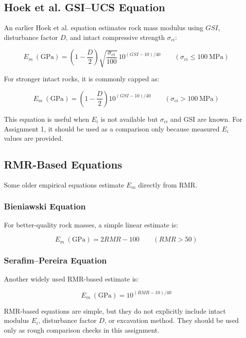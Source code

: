 \documentclass[a4paper,12pt]{article}
\begin{document}
\subsection{Hoek et al. GSI--UCS Equation}

An earlier Hoek et al. equation estimates rock mass modulus using \(GSI\), disturbance
factor \(D\), and intact compressive strength \(\sigma_{ci}\):

\[
E_m~(\text{GPa}) =
\left(1-\frac{D}{2}\right)
\sqrt{\frac{\sigma_{ci}}{100}}
\,
10^{(GSI-10)/40}
\qquad
(\sigma_{ci} \leq 100~\text{MPa})
\]

For stronger intact rocks, it is commonly capped as:

\[
E_m~(\text{GPa}) =
\left(1-\frac{D}{2}\right)
10^{(GSI-10)/40}
\qquad
(\sigma_{ci} > 100~\text{MPa})
\]

\begin{notebox}
This equation is useful when \(E_i\) is not available but \(\sigma_{ci}\) and GSI are known.
For Assignment 1, it should be used as a comparison only because measured \(E_i\) values
are provided.
\end{notebox}

\subsection{RMR-Based Equations}

Some older empirical equations estimate \(E_m\) directly from RMR.

\subsubsection{Bieniawski Equation}

For better-quality rock masses, a simple linear estimate is:

\[
E_m~(\text{GPa}) = 2RMR - 100
\qquad
(RMR > 50)
\]

\subsubsection{Serafim--Pereira Equation}

Another widely used RMR-based estimate is:

\[
E_m~(\text{GPa}) =
10^{(RMR-10)/40}
\]

\begin{warnbox}
RMR-based equations are simple, but they do not explicitly include intact modulus
\(E_i\), disturbance factor \(D\), or excavation method. They should be used only as
rough comparison checks in this assignment.
\end{warnbox}
\end{document}
